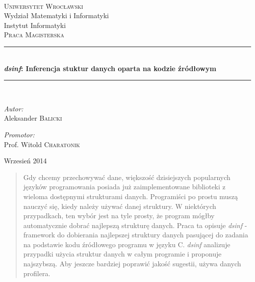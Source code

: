 \documentclass[a4paper,11pt]{article}
\newcommand{\HRule}{\rule{\linewidth}{0.5mm}}
\begin{document}

\begin{titlepage}
\begin{center}

\textsc{\LARGE \\ Uniwersytet Wrocławski }\\
Wydział Matematyki i Informatyki \\
Instytut Informatyki \\[1.5cm]

\textsc{\Large Praca Magisterska}\\[0.5cm]

\HRule \\[0.4cm]
{ \huge \bfseries \emph{dsinf}: Inferencja stuktur danych oparta na kodzie źródłowym \\[0.4cm] }

\HRule \\[1.5cm]

\begin{minipage}{0.4\textwidth}
\begin{flushleft} \large
\emph{Autor:}\\
Aleksander \textsc{Balicki}
\end{flushleft}
\end{minipage}
\begin{minipage}{0.4\textwidth}
\begin{flushright} \large
\emph{Promotor:} \\
Prof. Witold \textsc{Charatonik}
\end{flushright}
\end{minipage}

\vfill

{\large Wrzesień 2014}
\thispagestyle{empty}
\end{center}
\end{titlepage}

\renewcommand{\abstractname}{Streszczenie}
\begin{abstract}

	Gdy chcemy przechowywać dane, większość dzisiejszych popularnych języków programowania posiada już zaimplementowane biblioteki z wieloma dostępnymi strukturami danych. 
	Programiści po prostu muszą nauczyć się, kiedy należy używać danej struktury. W niektórych przypadkach, ten wybór jest na tyle prosty,
	że program mógłby automatycznie dobrać najlepszą strukturę danych. Praca ta opisuje \emph{dsinf} - framework do dobierania najlepszej struktury danych pasującej do zadania na podstawie kodu źródłowego programu w języku C. \emph{dsinf} analizuje przypadki użycia struktur danych w całym programie i proponuje najszybszą. 
	Aby jeszcze bardziej poprawić jakość sugestii, używa danych profilera.

\end{abstract}
\thispagestyle{empty}
\pagebreak
\end{document}
